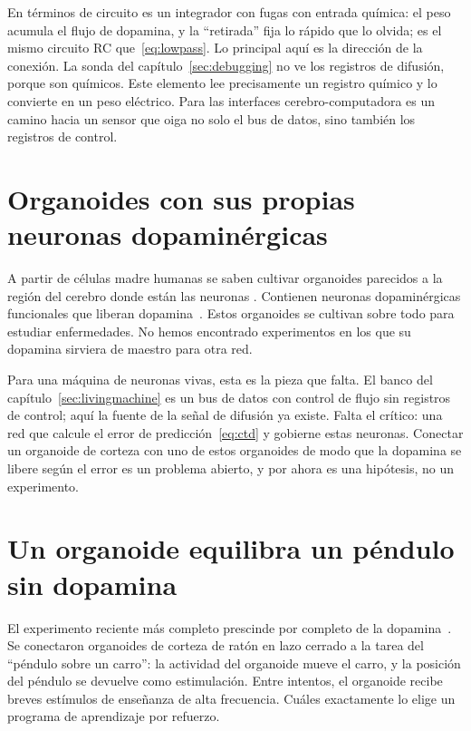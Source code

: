 En términos de circuito es un integrador con fugas con entrada química: el peso acumula el flujo de dopamina, y la “retirada” fija lo rápido que lo olvida; es el mismo circuito RC que~\eqref{eq:lowpass}. Lo principal aquí es la dirección de la conexión. La sonda del capítulo~\ref{sec:debugging} no ve los registros de difusión, porque son químicos. Este elemento lee precisamente un registro químico y lo convierte en un peso eléctrico. Para las interfaces cerebro-computadora es un camino hacia un sensor que oiga no solo el bus de datos, sino también los registros de control.

\section{Organoides con sus propias neuronas dopaminérgicas}
\label{sec:midbrainorg}

A partir de células madre humanas se saben cultivar organoides parecidos a la región del cerebro donde están las neuronas . Contienen neuronas dopaminérgicas funcionales que liberan dopamina~\cite{Jo2016}. Estos organoides se cultivan sobre todo para estudiar enfermedades. No hemos encontrado experimentos en los que su dopamina sirviera de maestro para otra red.

Para una máquina de neuronas vivas, esta es la pieza que falta. El banco del capítulo~\ref{sec:livingmachine} es un bus de datos con control de flujo sin registros de control; aquí la fuente de la señal de difusión ya existe. Falta el crítico: una red que calcule el error de predicción~\eqref{eq:ctd} y gobierne estas neuronas. Conectar un organoide de corteza con uno de estos organoides de modo que la dopamina se libere según el error es un problema abierto, y por ahora es una hipótesis, no un experimento.

\section{Un organoide equilibra un péndulo sin dopamina}
\label{sec:cartpole}

El experimento reciente más completo prescinde por completo de la dopamina~\cite{Robbins2026}. Se conectaron organoides de corteza de ratón en lazo cerrado a la tarea del “péndulo sobre un carro”: la actividad del organoide mueve el carro, y la posición del péndulo se devuelve como estimulación. Entre intentos, el organoide recibe breves estímulos de enseñanza de alta frecuencia. Cuáles exactamente lo elige un programa de aprendizaje por refuerzo.

